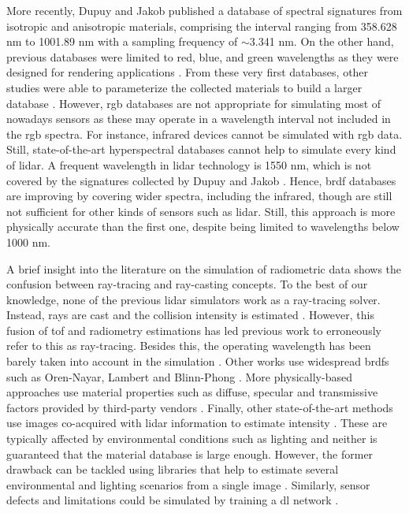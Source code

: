 More recently, Dupuy and Jakob \cite{dupuy_adaptive_2018} published a database of spectral signatures from isotropic and anisotropic materials, comprising the interval ranging from 358.628 \si{\nano\meter} to 1001.89 \si{\nano\meter} with a sampling frequency of $\sim$3.341 \si{\nano\meter}. On the other hand, previous databases were limited to red, blue, and green wavelengths as they were designed for rendering applications \cite{matusik_data-driven_2003}. From these very first databases, other studies were able to parameterize the collected materials to build a larger database \cite{serrano_intuitive_2016}. However, \acrshort{rgb} databases are not appropriate for simulating most of nowadays sensors as these may operate in a wavelength interval not included in the \acrshort{rgb} spectra. For instance, infrared devices cannot be simulated with \acrshort{rgb} data. Still, state-of-the-art hyperspectral databases cannot help to simulate every kind of \acrshort{lidar}. A frequent wavelength in \acrshort{lidar} technology is 1550 \si{\nano\meter}, which is not covered by the signatures collected by Dupuy and Jakob \cite{dupuy_adaptive_2018}. Hence, \acrshort{brdf} databases are improving by covering wider spectra, including the infrared, though are still not sufficient for other kinds of sensors such as \acrshort{lidar}. Still, this approach is more physically accurate than the first one, despite being limited to wavelengths below 1000 \si{\nano\meter}.

A brief insight into the literature on the simulation of radiometric data shows the confusion between ray-tracing and ray-casting concepts. To the best of our knowledge, none of the previous \acrshort{lidar} simulators work as a ray-tracing solver. Instead, rays are cast and the collision intensity is estimated \cite{ahn_real-time_2020, zhao_method_2021, bechtold_helios_2016}. However, this fusion of \acrshort{tof} and radiometry estimations has led previous work to erroneously refer to this as ray-tracing. Besides this, the operating wavelength has been barely taken into account in the simulation \cite{chen_analysis_2022, gschwandtner_blensor_2011, zohdi_rapid_2020}. Other works use widespread \acrshort{brdf}s such as Oren-Nayar, Lambert and Blinn-Phong \cite{chen_analysis_2022}. More physically-based approaches use material properties such as diffuse, specular and transmissive factors provided by third-party vendors \cite{haider_development_2022}. Finally, other state-of-the-art methods use images co-acquired with \acrshort{lidar} information to estimate intensity \cite{vacek_learning_2022, xiao_synlidar_2021}. These are typically affected by environmental conditions such as lighting and neither is guaranteed that the material database is large enough. However, the former drawback can be tackled using libraries that help to estimate several environmental and lighting scenarios from a single image \cite{buslaev_albumentations_2020}. Similarly, sensor defects and limitations could be simulated by training a \acrshort{dl} network \cite{guillard_learning_2022}.

